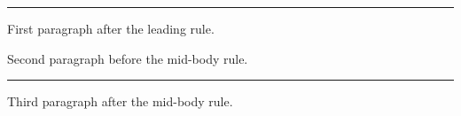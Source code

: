 \hsize=4in
\vsize=120pt
\nopagenumbers
\hrule
\noindent First paragraph after the leading rule.
\par
\noindent Second paragraph before the mid-body rule.
\par
\hrule
\noindent Third paragraph after the mid-body rule.
\par
\bye
